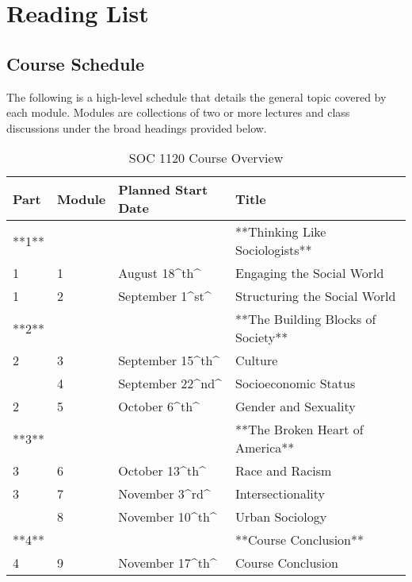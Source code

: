\documentclass[
]{book}
\begin{document}
\hypertarget{part-reading-list}{%
\part{Reading List}\label{part-reading-list}}

\hypertarget{course-schedule}{%
\chapter{Course Schedule}\label{course-schedule}}

The following is a high-level schedule that details the general topic covered by each module. Modules are collections of two or more lectures and class discussions under the broad headings provided below.

\begin{table}

\caption{\label{tab:unnamed-chunk-1}SOC 1120 Course Overview}
\centering
\begin{tabular}[t]{llll}
\toprule
Part & Module & Planned Start Date & Title\\
\midrule
**1** &  &  & **Thinking Like Sociologists**\\
1 & 1 & August 18\textasciicircum{}th\textasciicircum{} & Engaging the Social World\\
1 & 2 & September 1\textasciicircum{}st\textasciicircum{} & Structuring the Social World\\
**2** &  &  & **The Building Blocks of Society**\\
2 & 3 & September 15\textasciicircum{}th\textasciicircum{} & Culture\\
\addlinespace
2 & 4 & September 22\textasciicircum{}nd\textasciicircum{} & Socioeconomic Status\\
2 & 5 & October 6\textasciicircum{}th\textasciicircum{} & Gender and Sexuality\\
**3** &  &  & **The Broken Heart of America**\\
3 & 6 & October 13\textasciicircum{}th\textasciicircum{} & Race and Racism\\
3 & 7 & November 3\textasciicircum{}rd\textasciicircum{} & Intersectionality\\
\addlinespace
3 & 8 & November 10\textasciicircum{}th\textasciicircum{} & Urban Sociology\\
**4** &  &  & **Course Conclusion**\\
4 & 9 & November 17\textasciicircum{}th\textasciicircum{} & Course Conclusion\\
\bottomrule
\end{tabular}
\end{table}
\end{document}
